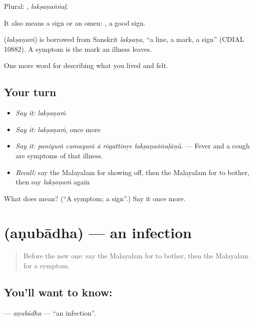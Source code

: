 Plural: , \emph{lakṣaṇaṅṅaḷ}.

It also means a sign or an omen:  , a good sign.

\begin{cousinweb}
\textbf{} (\emph{lakṣaṇaṁ}) is borrowed from Sanskrit \emph{lakṣaṇa}, \textquotedblleft{}a line, a mark, a sign\textquotedblright{} (CDIAL 10882). A symptom is the mark an illness leaves.
\end{cousinweb}

\begin{grammarlens}[title={What you've built}]
One more word for describing what you lived and felt.
\end{grammarlens}

\subsection*{Your turn}
\begin{itemize}
\raggedright
  \item \emph{Say it:} \emph{lakṣaṇaṁ}
  \item \emph{Say it:} \emph{lakṣaṇaṁ}, once more
  \item \emph{Say it:} \emph{paniyuṁ cumayuṁ ā rōgattinṟe lakṣaṇaṅṅaḷāṇŭ.} — Fever and a cough are symptoms of that illness.
  \item \emph{Recall:} say the Malayalam for showing off, then the Malayalam for to bother, then say \emph{lakṣaṇaṁ} again
\end{itemize}

\begin{tcolorbox}[breakable,colback=teal!4,colframe=teal!35!black,title={Before you move on}]
What does  mean? (\textquotedblleft{}A symptom; a sign\textquotedblright{}.) Say it once more.
\end{tcolorbox}
\section[\texorpdfstring{\ml{അണുബാധ} (aṇubādha)}{അണുബാധ (aṇubādha)}]{ (aṇubādha) — an infection}

\label{lesson:ML-C532-anubadha}



\begin{quote}
Before the new one: say the Malayalam for to bother, then the Malayalam for a symptom.
\end{quote}

\subsection*{You'll want to know: }
\textbf{} — \emph{aṇubādha} — \textquotedblleft{}an infection\textquotedblright{}.

